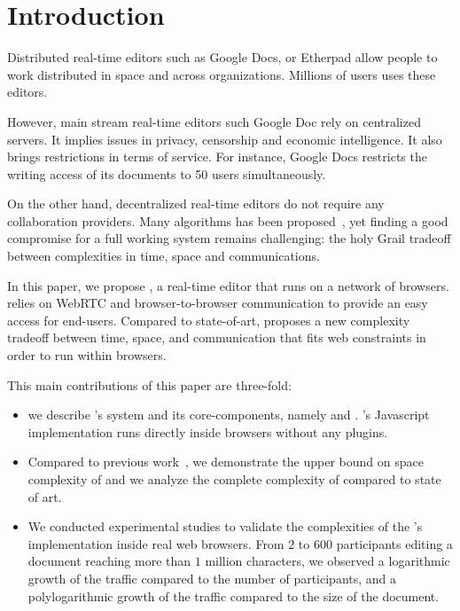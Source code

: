 
\section{Introduction}

Distributed real-time editors such as Google Docs, or Etherpad allow
people to work distributed in space and across organizations. Millions of users
uses these editors. 

However, main stream real-time editors such Google Doc rely on centralized
servers. It implies issues in privacy, censorship and economic intelligence. It
also brings restrictions in terms of service. For instance, Google Docs
restricts the writing access of its documents to 50 users simultaneously.

On the other hand, decentralized real-time editors do not require any
collaboration providers. Many algorithms has been
proposed~\cite{sun1998operational, oster2006data, sun2009contextbased}, yet
finding a good compromise for a full working system remains challenging: the
holy Grail tradeoff between complexities in time, space and communications.

In this paper, we propose \CRATE, a real-time editor that runs on a network of
browsers. \CRATE relies on WebRTC and browser-to-browser communication to
provide an easy access for end-users. Compared to state-of-art, \CRATE proposes
a new complexity tradeoff between time, space, and communication that fits web
constraints in order to run within browsers.

This main contributions of this paper are three-fold:
\begin{itemize}
\item we describe \CRATE's system and its core-components, namely \LSEQ and
  \SPRAY. \CRATE's Javascript implementation runs directly inside browsers
  without any plugins.
\item Compared to previous work~\cite{nedelec2013lseq}, we demonstrate the upper
  bound on space complexity of \LSEQ and we analyze the complete complexity of
  \CRATE compared to state of art.
\item We conducted experimental studies to validate the complexities of the
  \CRATE's implementation inside real web browsers. From $2$ to $600$
  participants editing a document reaching more than $1$ million characters, we
  observed a logarithmic growth of the traffic compared to the number of
  participants, and a polylogarithmic growth of the traffic compared to the size
  of the document.
\end{itemize}


